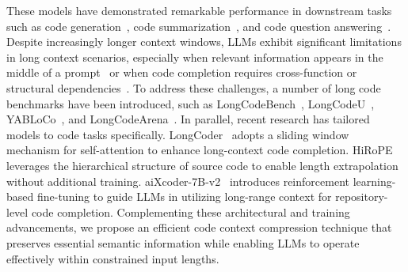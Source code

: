 \documentclass[10pt,conference]{IEEEtran}
\newcommand{\todoc}[2]{{\textcolor{#1}{\textbf{[#2]}}}}
\newcommand{\shi}[1]{\todoc{orange}{Shi: #1}}
\begin{document}
These models have demonstrated remarkable performance in downstream tasks such as code generation~\cite{nijkamp2022codegen,shi2024between}, code summarization~\cite{ahmad2020transformer,wang2025context}, and code question answering~\cite{gu2018deep,peng2025swe}.
Despite increasingly longer context windows, LLMs exhibit significant limitations in long context scenarios, especially when relevant information appears in the middle of a prompt~\cite{liu2023lost, li2023loogle} or when code completion requires cross-function or structural dependencies~\cite{bogomolov2024long, yu2024codereval}.
To address these challenges, a number of long code benchmarks have been introduced, such as LongCodeBench~\cite{rando2025longcodebench}, LongCodeU~\cite{li2025longcodeu}, YABLoCo~\cite{valeev2025yabloco}, and LongCodeArena~\cite{bogomolov2024long}. 
In parallel, recent research has tailored models to code tasks specifically. LongCoder~\cite{guo2023longcoder} adopts a sliding window mechanism for self-attention to enhance long-context code completion. HiRoPE~\cite{zhang2024hirope} leverages the hierarchical structure of source code to enable length extrapolation without additional training. aiXcoder-7B-v2~\cite{li2025aixcoder} introduces reinforcement learning-based fine-tuning to guide LLMs in utilizing long-range context for repository-level code completion. Complementing these architectural and training advancements, we propose an efficient code context compression technique that preserves essential semantic information while enabling LLMs to operate effectively within constrained input lengths.
\end{document}
